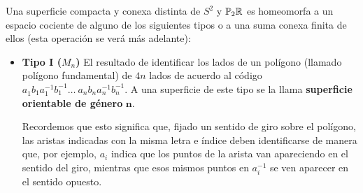 \documentclass[GTS.tex]{subfiles}
\begin{document}
\begin{teorema}
Una superficie compacta y conexa distinta de $S^2$ y $\mathbb{P}_2\mathbb{R}$ es homeomorfa a un espacio cociente de alguno de los siguientes tipos o a una suma conexa finita de ellos (esta operación se verá más adelante):
\begin{itemize}
\item \textbf{Tipo I ($M_n$)}
El resultado de identificar los lados de un polígono (llamado polígono fundamental) de $4n$ lados de acuerdo al código $a^{}_1 b^{}_1 a^{-1}_1 b^{-1}_1\dots\ a^{}_n b^{}_n a_n^{-1} b_n^{-1}$. A una superficie de este tipo se la llama \textbf{superficie orientable de género} $\mathbf{n}$.

Recordemos que esto significa que, fijado un sentido de giro sobre el polígono, las aristas indicadas con la misma letra e índice deben identificarse de manera que, por ejemplo,  $a_i$ indica que los puntos de la arista van apareciendo en el sentido del giro, mientras que esos mismos puntos en  $a_i^{-1}$ se ven aparecer  en el sentido opuesto.

\begin{center}
\end{center}
\end{itemize}
\end{teorema}
\end{document}
